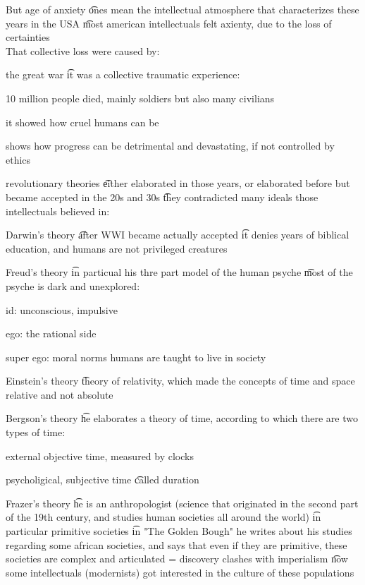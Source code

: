 \documentclass[12pt]{article}
\begin{document}
But age of anxiety \t ones mean the intellectual atmosphere that characterizes these years in the USA \t most american intellectuals felt axienty, due to the loss of certainties \\
That collective loss were caused by:
\bi
  \item the great war \t it was a collective traumatic experience:
    \bi
      \item 10 million people died, mainly soldiers but also many civilians
      \item it showed how cruel humans can be
      \item shows how progress can be detrimental and devastating, if not controlled by ethics
    \ei
  \item revolutionary theories \t either elaborated in those years, or elaborated before but became accepted in the 20s and 30s \t they contradicted many ideals those intellectuals believed in:
    \bi
      \item Darwin's theory \t after WWI became actually accepted \t it denies years of biblical education, and humans are not privileged creatures
      \item Freud's theory \t in particual his thre part model of the human psyche \t most of the psyche is dark and unexplored:
        \bi
          \item id: unconscious, impulsive
          \item ego: the rational side
          \item super ego: moral norms humans are taught to live in society
        \ei
      \item Einstein's theory \t theory of relativity, which made the concepts of time and space relative and not absolute
      \item Bergson's theory \t he elaborates a theory of time, according to which there are two types of time:
        \bi
          \item external objective time, measured by clocks
          \item psycholigical, subjective time \t called duration
        \ei
      \item Frazer's theory \t he is an anthropologist (science that originated in the second part of the 19th century, and studies human societies all around the world) \t in particular primitive societies \t in "The Golden Bough" he writes about his studies regarding some african societies, and says that even if they are primitive, these societies are complex and articulated = discovery clashes with imperialism \t now some intellectuals (modernists) got interested in the culture of these populations
    \ei
\ei
\end{document}
